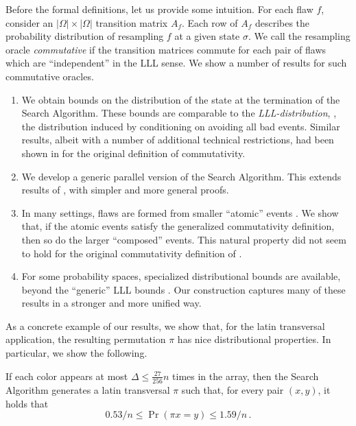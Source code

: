 \documentclass{toc}
\begin{document}
Before the formal definitions,  let us provide some intuition. For each flaw $f$, consider an $| \Omega | \times |\Omega |$ transition matrix $A_f$. Each row of $A_f$   describes the probability distribution of resampling $f$ at a given state $\sigma$.  We call the resampling oracle \emph{commutative} if the transition matrices commute for
%
each  %
pair of flaws which are ``independent'' in the LLL sense. We show a number of results for such  commutative oracles. %
%
\begin{enumerate} 

%
\item We obtain bounds on the distribution of the state at the termination of the Search Algorithm. These bounds are comparable to the \emph{LLL-distribution}, \ie, the distribution induced by conditioning on avoiding all bad events. Similar results, albeit with a number of additional technical restrictions, had been shown in \cite{LLLWTL} for the original definition of commutativity. 

\item We develop a generic parallel version of the Search Algorithm. This extends results of \cite{Kolmofocs, ParallelHarris}, with simpler and more general proofs.

\item In many settings, flaws are formed from smaller ``atomic'' events \cite{ParallelHarris}. We show that, if the atomic events satisfy the generalized commutativity definition, then so do the larger ``composed'' events. This natural property did not seem to hold for the original commutativity definition of \cite{Kolmofocs}.

\item For some probability spaces, specialized distributional  bounds  are available,  beyond the ``generic'' LLL bounds \cite{NewBoundsHarris}.  Our construction captures many of these results in a stronger and more unified way.
%
\end{enumerate}

As a concrete example of our results, we show that, for the latin transversal application, the resulting permutation $\pi$ has nice distributional properties. In particular, we show the following.  %

\begin{theorem}
\label{perm-thm44}
If each color appears at most $\Delta \leq \frac{27}{256} n$ times in the array, then the Search Algorithm generates a latin transversal $\pi$ such that, for every pair $(x,y)$, it holds that $$
0.53/n \leq \Pr( \pi x = y ) \leq 1.59/n\,.  %
$$                       %
\end{theorem}
\end{document}
